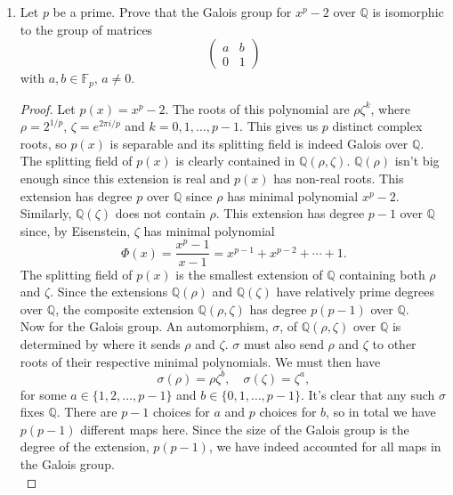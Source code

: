 \documentclass[11pt,letterpaper]{report}
\newcommand{\integers}{\mathbb{Z}}
\newcommand{\rationals}{\mathbb{Q}}
\newcommand{\field}{\mathbb{F}}
\newenvironment{solution}
{\begin{proof}[Solution]}
{\end{proof}}
\begin{document}
\begin{enumerate}
\begin{enumerate}
		\item Find an example of a ring $R$ and nonconstant polynomials $f(x), g(x)\in R[x]$ such that $f(x)g(x) = 1$.
		\begin{solution}
			In $(\integers/4\integers)[x]$ we have that $(2x+3)^2 = 1$.
		\end{solution}
	\end{enumerate}

	\item Let $p$ be a prime. Prove that the Galois group for $x^p-2$ over $\rationals$ is isomorphic to the group of matrices
	\[
	\begin{pmatrix}
		a & b\\
		0 & 1
	\end{pmatrix}
	\]
	with $a,b\in \field_p$, $a\neq 0$.
	\begin{proof}
		Let $p(x) = x^p-2$. The roots of this polynomial are $\rho\zeta^k$, where $\rho = 2^{1/p}$, $\zeta = e^{2\pi i/p}$ and $k = 0, 1, \ldots, p-1$. This gives us $p$ distinct complex roots, so $p(x)$ is separable and its splitting field is indeed Galois over $\rationals$.\\

		The splitting field of $p(x)$ is clearly contained in $\rationals(\rho, \zeta)$. $\rationals(\rho)$ isn't big enough since this extension is real and $p(x)$ has non-real roots. This extension has degree $p$ over $\rationals$ since $\rho$ has minimal polynomial $x^p - 2$. Similarly, $\rationals(\zeta)$ does not contain $\rho$. This extension has degree $p-1$ over $\rationals$ since, by Eisenstein, $\zeta$ has minimal polynomial
		\[
		\Phi(x) = \frac{x^p-1}{x-1} = x^{p-1} + x^{p-2} + \cdots + 1.
		\]
		The splitting field of $p(x)$ is the smallest extension of $\rationals$ containing both $\rho$ and $\zeta$. Since the extensions $\rationals(\rho)$ and $\rationals(\zeta)$ have relatively prime degrees over $\rationals$, the composite extension $\rationals(\rho, \zeta)$ has degree $p(p-1)$ over $\rationals$.\\

		Now for the Galois group. An automorphism, $\sigma$, of $\rationals(\rho, \zeta)$ over $\rationals$ is determined by where it sends $\rho$ and $\zeta$. $\sigma$ must also send $\rho$ and $\zeta$ to other roots of their respective minimal polynomials. We must then have
		\[
		\sigma(\rho) = \rho\zeta^b,\quad \sigma(\zeta) = \zeta^a,
		\]
		for some $a \in \{1, 2, \ldots, p-1\}$ and $b\in \{0, 1, \ldots, p-1\}$. It's clear that any such $\sigma$ fixes $\rationals$. There are $p-1$ choices for $a$ and $p$ choices for $b$, so in total we have $p(p-1)$ different maps here. Since the size of the Galois group is the degree of the extension, $p(p-1)$, we have indeed accounted for all maps in the Galois group.\\


\end{proof}
\end{enumerate}
\end{document}
